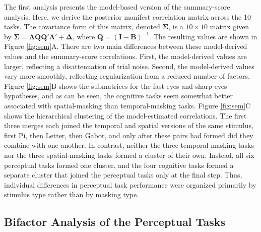 \documentclass[
  ,man]{apa6}
\begin{document}
The first analysis presents the model-based version of the summary-score analysis. Here, we derive the posterior manifest correlation matrix across the 10 tasks. The covariance form of this matrix, denoted \(\boldsymbol{\Sigma}\), is a \(10\times10\) matrix given by \(\boldsymbol{\Sigma} = \boldsymbol{\Lambda}\mathbf{Q}\mathbf{Q}'\boldsymbol{\Lambda}' + \boldsymbol{\Delta}\), where \(\mathbf{Q}=(\mathbf{I}-\mathbf{B})^{-1}\). The resulting values are shown in Figure \ref{fig:sem}A. There are two main differences between these model-derived values and the summary-score correlations. First, the model-derived values are larger, reflecting a disattenuation of trial noise. Second, the model-derived values vary more smoothly, reflecting regularization from a reduced number of factors. Figure \ref{fig:sem}B shows the submatrices for the fast-eyes and sharp-eyes hypotheses, and as can be seen, the cognitive tasks seem somewhat better associated with spatial-masking than temporal-masking tasks. Figure \ref{fig:sem}C shows the hierarchical clustering of the model-estimated correlations. The first three merges each joined the temporal and spatial versions of the same stimulus, first Pi, then Letter, then Gabor, and only after these pairs had formed did they combine with one another. In contrast, neither the three temporal-masking tasks nor the three spatial-masking tasks formed a cluster of their own. Instead, all six perceptual tasks formed one cluster, and the four cognitive tasks formed a separate cluster that joined the perceptual tasks only at the final step. Thus, individual differences in perceptual task performance were organized primarily by stimulus type rather than by masking type.

\subsection{Bifactor Analysis of the Perceptual Tasks}\label{bifactor-analysis-of-the-perceptual-tasks}
\end{document}
